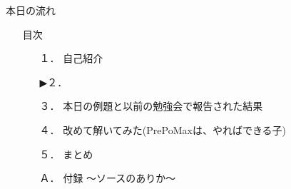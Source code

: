 \begin{frame}{本日の流れ}
  \begin{itemize}
      \item[] 目次
      \begin{itemize}[itemsep=1.3ex, leftmargin=1cm]
        \item[１．] 自己紹介
        \item[▶２．] 
        \item[３．] 本日の例題と以前の勉強会で報告された結果
        \item[４．] 改めて解いてみた(PrePoMaxは、やればできる子)
        \item[５．] まとめ
        \item[Ａ．] 付録 ～ソースのありか～
     \end{itemize}
  \end{itemize}
\end{frame}
